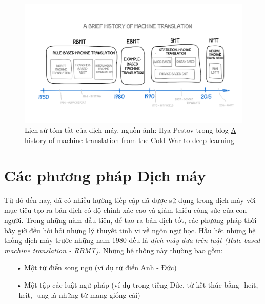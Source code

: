 \begin{figure}
	\centering
	\includegraphics[width=\textwidth]{mthistory}
	\caption[Lịch sử tóm tắt của dịch máy]{Lịch sử tóm tắt của dịch máy, nguồn ảnh: Ilya Pestov trong blog \href{https://medium.freecodecamp.org/a-history-of-machine-translation-from-the-cold-war-to-deep-learning-f1d335ce8b5}{A history of machine translation from the Cold War to deep learning}}
	\label{fig_mthistory}
\end{figure}

\section{Các phương pháp Dịch máy}

Từ đó đến nay, đã có nhiều hướng tiếp cập đã được sử dụng trong dịch máy với mục tiêu tạo ra bản dịch có độ chính xác cao và giảm thiểu công sức của con người. Trong những năm đầu tiên, để tạo ra bản dịch tốt, các phương pháp thời bấy giờ đều hỏi hỏi những lý thuyết tinh vi về ngôn ngữ học. Hầu hết những hệ thống dịch máy trước những năm 1980 đều là \textit{dịch máy dựa trên luật (Rule-based machine translation - RBMT)}. Những hệ thống này thường bao gồm:
\begin{itemize}
	\item[•] Một từ điển song ngữ (ví dụ từ điển Anh - Đức)
	\item[•] Một tập các luật ngữ pháp (ví dụ trong tiếng Đức, từ kết thúc bằng -heit, -keit, -ung là những từ mang giống cái)		
\end{itemize} 

